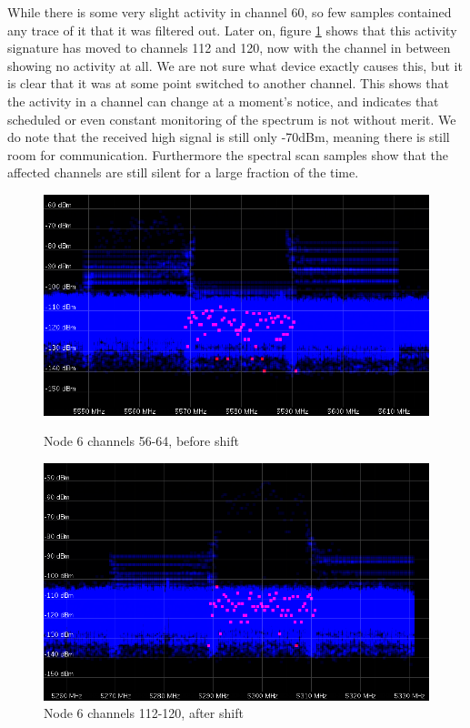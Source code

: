 \documentclass[a4paper, 11pt]{article}
\begin{document}
 While there is some very slight activity in channel 60, so few samples contained any trace of it that it was filtered out. Later on, figure \ref{cot6_50_late} shows that this activity signature has moved to channels 112 and 120, now with the channel in between showing no activity at all. We are not sure what device exactly causes this, but it is clear that it was at some point switched to another channel. This shows that the activity in a channel can change at a moment's notice, and indicates that scheduled or even constant monitoring of the spectrum is not without merit. We do note that the received high signal is still only -70dBm, meaning there is still room for communication. Furthermore the spectral scan samples show that the affected channels are still silent for a large fraction of the time.



\begin{figure}
\begin{minipage}[t]{0.47\textwidth}
\centering
\includegraphics[width=\textwidth]{cot6_50_early.png}
\caption{Node 6 channels 56-64, before shift}
\label{cot6_50_early}
\end{minipage}\hfill
\begin{minipage}[t]{0.47\textwidth}
\centering
\includegraphics[width=\textwidth]{cot6_50_late.png}
\caption{Node 6 channels 112-120, after shift}
\label{cot6_50_late}
\end{minipage}\hfill
\end{figure}
\end{document}
